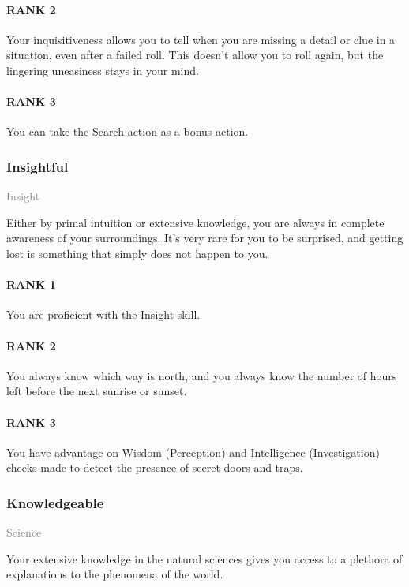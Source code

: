 \paragraph{RANK 2} Your inquisitiveness allows you to tell when you are missing a detail or clue in a situation, even after a failed roll.
This doesn't allow you to roll again, but the lingering uneasiness stays in your mind.
\paragraph{RANK 3} You can take the Search action as a bonus action.

\subsubsection{Insightful} \label{feat::insightful}
\small{\textcolor{gray}{Insight}}

\normalsize
Either by primal intuition or extensive knowledge, you are always in complete awareness of your surroundings.
It's very rare for you to be surprised, and getting lost is something that simply does not happen to you.
\paragraph{RANK 1} You are proficient with the Insight skill.
\paragraph{RANK 2} You always know which way is north, and you always know the number of hours left before the next sunrise or sunset.
\paragraph{RANK 3} You have advantage on Wisdom (Perception) and Intelligence (Investigation) checks made to detect the presence of secret doors and traps.

\subsubsection{Knowledgeable} \label{feat::knowledgeable}
\small{\textcolor{gray}{Science}}

\normalsize
Your extensive knowledge in the natural sciences gives you access to a plethora of explanations to the phenomena of the world.
